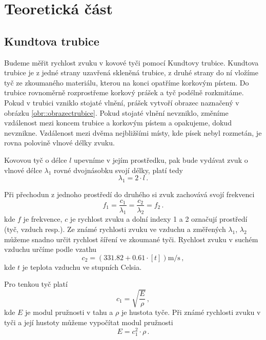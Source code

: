 \section*{Teoretická část}
\subsection*{Kundtova trubice}
Budeme měřit rychlost zvuku v kovové tyči pomocí Kundtovy trubice.
Kundtova trubice je z jedné strany uzavřená skleněná trubice, z druhé strany do ní vložíme tyč ze zkoumaného materiálu, kterou na konci opatříme korkovým pístem.
Do trubice rovnoměrně rozprostřeme korkový prášek a tyč podélně rozkmitáme.
Pokud v trubici vzniklo stojaté vlnění, prášek vytvoří obrazec naznačený v obrázku \ref{obr::obrazectrubice}.
Pokud stojaté vlnění nevzniklo, změníme vzdálenost mezi koncem trubice a korkovým pístem a opakujeme, dokud nevznikne.
Vzdálenost mezi dvěma nejbližšími místy, kde písek nebyl rozmetán, je rovna polovině vlnové délky zvuku.


Kovovou tyč o délce $l$ upevníme v jejím prostředku, pak bude vydávat zvuk o vlnové délce $\lambda_1$ rovné dvojnásobku svojí délky, platí tedy
\begin{equation}
\lambda_1=2 \cdot l  \,.
\end{equation}

Při přechodun z jednoho prostředí do druhého si zvuk zachovává svojí frekvenci
\begin{equation}
f_1= \frac{c_1}{\lambda_1}=\frac{c_2}{\lambda_2}=f_2 \,.
\end{equation}
kde $f$ je frekvence, $c$ je rychlost zvuku a dolní indexy 1 a 2 označují prostředí (tyč, vzduch resp.).
Ze známé rychlosti zvuku ve vzduchu a změřených $\lambda_1$, $\lambda_2$ můžeme snadno určit rychlost šíření ve zkoumané tyči.
Rychlost zvuku v suchém vzduchu určíme podle vzathu \cite{ZFP}
\begin{equation}
c_2 =(\num{331.82} + \num{0.61} \cdot [t]) \si{\m\per\s} \,,
\end{equation}
kde $t$ je teplota vzduchu ve stupních Celsia.

Pro tenkou tyč platí \cite{ZFP}
\begin{equation}
c_1 = \sqrt{ \frac{E}{\rho}  } \,,
\end{equation}
kde $E$ je modul pružnosti v tahu a $\rho$ je hustota tyče.
Při známé rychlosti zvuku v tyči a její hustoty můžeme vypočítat modul pružnosti 
\begin{equation}
E=c_1^2 \cdot \rho \,.
\end{equation}


